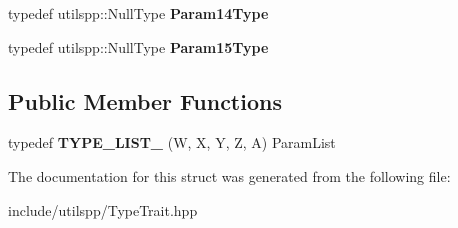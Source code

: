 \begin{DoxyCompactItemize}
\item 
\hypertarget{structutilspp_1_1PointerOnFunction_3_01V_07_5_08_07W_00_01X_00_01Y_00_01Z_00_01A_08_4_a6f33fd9cc71b3eed2ef704b52c300947}{typedef utilspp\-::\-Null\-Type {\bfseries Param14\-Type}}\label{structutilspp_1_1PointerOnFunction_3_01V_07_5_08_07W_00_01X_00_01Y_00_01Z_00_01A_08_4_a6f33fd9cc71b3eed2ef704b52c300947}

\item 
\hypertarget{structutilspp_1_1PointerOnFunction_3_01V_07_5_08_07W_00_01X_00_01Y_00_01Z_00_01A_08_4_a971047a663f90b54882757e6624e2c98}{typedef utilspp\-::\-Null\-Type {\bfseries Param15\-Type}}\label{structutilspp_1_1PointerOnFunction_3_01V_07_5_08_07W_00_01X_00_01Y_00_01Z_00_01A_08_4_a971047a663f90b54882757e6624e2c98}

\end{DoxyCompactItemize}
\subsection*{Public Member Functions}
\begin{DoxyCompactItemize}
\item 
\hypertarget{structutilspp_1_1PointerOnFunction_3_01V_07_5_08_07W_00_01X_00_01Y_00_01Z_00_01A_08_4_a4118368d52325ee810ff2cc670f8490a}{typedef {\bfseries T\-Y\-P\-E\-\_\-\-L\-I\-S\-T\-\_} (W, X, Y, Z, A) Param\-List}\label{structutilspp_1_1PointerOnFunction_3_01V_07_5_08_07W_00_01X_00_01Y_00_01Z_00_01A_08_4_a4118368d52325ee810ff2cc670f8490a}

\end{DoxyCompactItemize}


The documentation for this struct was generated from the following file\-:\begin{DoxyCompactItemize}
\item 
include/utilspp/Type\-Trait.\-hpp\end{DoxyCompactItemize}
